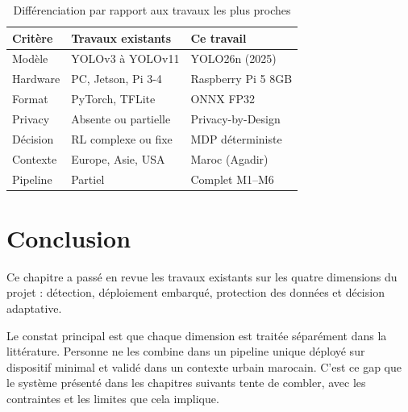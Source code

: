 \begin{table}[H]
\centering
\caption{Différenciation par rapport
         aux travaux les plus proches}
\begin{tabularx}{\textwidth}{lXX}
\toprule
\textbf{Critère} &
\textbf{Travaux existants} &
\textbf{Ce travail} \\
\midrule
Modèle &
YOLOv3 à YOLOv11 &
YOLO26n (2025) \\
Hardware &
PC, Jetson, Pi 3-4 &
Raspberry Pi 5 8GB \\
Format &
PyTorch, TFLite &
ONNX FP32 \\
Privacy &
Absente ou partielle &
Privacy-by-Design \\
Décision &
RL complexe ou fixe &
MDP déterministe \\
Contexte &
Europe, Asie, USA &
Maroc (Agadir) \\
Pipeline &
Partiel &
Complet M1--M6 \\
\bottomrule
\end{tabularx}
\label{tab:positioning}
\end{table}

\section*{Conclusion}

Ce chapitre a passé en revue les travaux
existants sur les quatre dimensions du
projet : détection, déploiement embarqué,
protection des données et décision
adaptative.

Le constat principal est que chaque dimension
est traitée séparément dans la littérature.
Personne ne les combine dans un pipeline
unique déployé sur dispositif minimal et
validé dans un contexte urbain marocain.
C'est ce gap que le système présenté dans
les chapitres suivants tente de combler,
avec les contraintes et les limites que
cela implique.